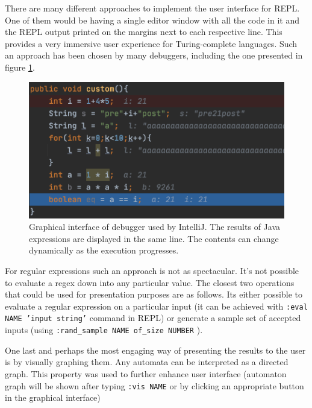 There are many different approaches to implement the user interface for REPL.
One of them would be having a single editor window with all the code in it and the REPL output printed on the margins next to each respective line. This provides a very immersive user experience for Turing-complete languages. Such an approach has been chosen by many debuggers, including the one presented in figure \ref{intellij_debug}.
\begin{figure}[h]
	\centering
	\includegraphics[scale=0.85]{java_repl.png}
	\caption{Graphical interface of debugger used by IntelliJ. The results of Java expressions are displayed in the same line. The contents can change dynamically as the execution progresses.}
	\label{intellij_debug}
\end{figure}
For regular expressions such an approach is not as spectacular. 
It's not possible to evaluate a regex down into any particular value.
The closest two operations that could be used for presentation purposes are as follows. Its either possible to evaluate a regular expression on a particular input (it can be achieved with \texttt{:eval NAME 'input string'} command in REPL) or generate a sample set of accepted inputs (using \texttt{:rand\_sample NAME of\_size NUMBER} ).

One last and perhaps the most engaging way of presenting the results to the user is by visually graphing them.
Any automata can be interpreted as a directed graph. This property  was used to further enhance user interface (automaton graph will be shown after typing \texttt{:vis NAME} or by clicking an appropriate button in the graphical interface)

